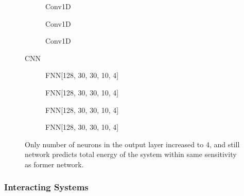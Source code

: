 \documentclass[a4paper,times,12pt]{article}
\begin{document}
\begin{figure}[H]
    \centering
    \begin{subfigure}[t]{0.45\textwidth}
		\centering
        
        \caption{Conv1D}
		\label{fig:a}
    \end{subfigure}\hfill
    \begin{subfigure}[t]{0.45\textwidth}
		\centering
        
        \caption{Conv1D}
		\label{fig:b}
    \end{subfigure}\hfill    
    \begin{subfigure}[t]{0.45\textwidth}
        \centering
        
        \caption{Conv1D}
		\label{fig:c}
    \end{subfigure}
    \caption{CNN}
\end{figure}

\begin{figure}[H]
    \centering
    \begin{subfigure}[t]{0.45\textwidth}
		\centering
        
        \caption{FNN[128, 30, 30, 10, 4]}
		\label{fig:a}
    \end{subfigure}\hfill
    \begin{subfigure}[t]{0.45\textwidth}
		\centering
        
        \caption{FNN[128, 30, 30, 10, 4]}
		\label{fig:b}
    \end{subfigure}\hfill    
    \begin{subfigure}[t]{0.45\textwidth}
        \centering
        
        \caption{FNN[128, 30, 30, 10, 4]}
		\label{fig:c}
    \end{subfigure}\hfill
    \begin{subfigure}[t]{0.45\textwidth}
        \centering
        
        \caption{FNN[128, 30, 30, 10, 4]}
		\label{fig:c}
    \end{subfigure}
	\caption{Only number of neurons in the output layer increased to 4, and still network predicts total energy of the system within same sensitivity as former network.}
\end{figure}

\subsubsection{Interacting Systems}
\end{document}
